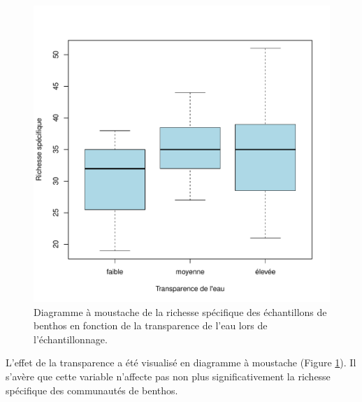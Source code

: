 \documentclass[9pt,twocolumn,twoside,]{pnas-new}
\begin{document}
\begin{figure}
\centering
\includegraphics{boxplot_richesse.pdf}
\caption{Diagramme à moustache de la richesse spécifique des
échantillons de benthos en fonction de la transparence de l'eau lors de
l'échantillonnage. \label{fig:boxplot_richesse}}
\end{figure}

L'effet de la transparence a été visualisé en diagramme à moustache
(Figure \ref{fig:boxplot_richesse}). Il s'avère que cette variable
n'affecte pas non plus significativement la richesse spécifique des
communautés de benthos.
\end{document}
